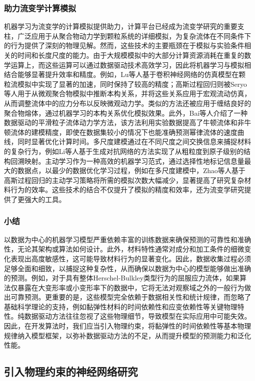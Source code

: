 \subsubsection{助力流变学计算模拟}
机器学习为流变学的计算模拟提供助力，计算平台已经成为流变学研究的重要支柱，广泛应用于从聚合物动力学到颗粒系统的详细模拟，为复杂流体在不同条件下的行为提供了深刻的物理见解。然而，这些技术的主要瓶颈在于模拟与实验条件相关的时间和长度尺度的能力。由于大规模模拟中的大部分计算资源消耗在重复的数学运算上，而这些运算可以通过数据驱动技术高效学习，因此将机器学习与模拟相结合能够显著提升效率和精度。例如，Lu等人基于卷积神经网络的仿真模型在颗粒流模拟中实现了显著的加速，同时保持了较高的精度；高斯过程回归则被Seryo等人用于从微观聚合物模拟中推断本构关系，并将这些关系应用于宏观流动仿真，从而调整流体中的应力分布以反映微观动力学。类似的方法还被应用于缠结良好的聚合物熔体，通过机器学习的本构关系优化模拟效果。此外，Bai等人介绍了一种数据驱动的平滑粒子流体动力学方法，该方法利用实验数据提高了牛顿流体和非牛顿流体的建模精度，即使在数据集较小的情况下也能准确预测幂律流体的速度曲线，同时显著优化计算时间。多尺度建模通过在不同尺度之间交换信息来捕捉材料的复杂行为，例如Li等人基于生成对抗网络的方法实现了从粗粒度到原子级别的结构回溯映射。主动学习作为一种高效的机器学习范式，通过选择性地标记信息量最大的数据点，以最少的数据优化学习过程，例如在多尺度建模中，Zhao等人基于高斯过程回归的主动学习策略将所需的模拟次数大幅减少，显著提高了研究复杂材料行为的效率。这些技术的结合不仅提升了模拟的精度和效率，还为流变学研究提供了更强大的工具。

\subsubsection{小结}
以数据为中心的机器学习模型严重依赖丰富的训练数据来确保预测的可靠性和准确性，无论其架构或算法如何设计。此外，材料特性通常对成分和加工条件的细微变化表现出高度敏感性，这可能导致材料行为的显著变化。因此，数据收集过程必须足够全面和细致，以捕捉这种复杂性，从而确保以数据为中心的模型能够做出准确的预测。例如，对于具有整体Herschel-Bulkley类型行为的屈服应力流体，如果算法仅暴露在大变形率或小变形率下的数据中，它将无法对观察域之外的一般行为做出可靠预测。更重要的是，这些模型完全依赖于数据相关性和统计规律，而忽略了基础科学理论的支持，例如黏弹性材料的时间依赖性和应变依赖性等关键物理特性。纯数据驱动方法往往忽视了这些物理细节，导致模型在实际应用中可能失效。因此，在开发算法时，我们应当引入物理约束，将黏弹性的时间依赖性等基本物理规律纳入模型框架，以弥补数据驱动方法的不足，从而提升模型的预测能力和泛化性能。
\subsection{引入物理约束的神经网络研究}
